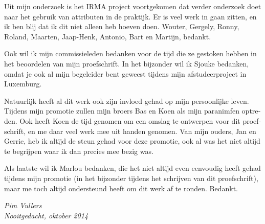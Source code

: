 \begin{otherlanguage}{dutch}
Uit mijn onderzoek is het IRMA project voortgekomen dat verder onderzoek doet
naar het gebruik van attributen in de praktijk. Er is veel werk in gaan zitten,
en ik ben blij dat ik dit niet alleen heb hoeven doen. Wouter, Gergely, Ronny,
Roland, Maarten, Jaap-Henk, Antonio, Bart en Martijn, bedankt.

Ook wil ik mijn commissieleden bedanken voor de tijd die ze gestoken hebben in 
het beoordelen van mijn proefschrift. In het bijzonder wil ik Sjouke bedanken, 
omdat je ook al mijn begeleider bent geweest tijdens mijn afstudeerproject in 
Luxemburg.

Natuurlijk heeft al dit werk ook zijn invloed gehad op mijn persoonlijke leven.
Tijdens mijn promotie zullen mijn broers Bas en Koen als mijn paranimfen 
optreden. Ook heeft Koen de tijd genomen om een omslag te ontwerpen voor dit
proefschrift, en me daar veel werk mee uit handen genomen. Van mijn ouders,
Jan en Gerrie, heb ik altijd de steun gehad voor deze promotie, ook al was het
niet altijd te begrijpen waar ik dan precies mee bezig was. 

Als laatste wil ik Marlou bedanken, die het niet altijd even eenvoudig heeft 
gehad tijdens mijn promotie (in het bijzonder tijdens het schrijven van dit 
proefschrift), maar me toch altijd ondersteund heeft om dit werk af te ronden. 
Bedankt.

\begin{flushright}\it
  Pim Vullers \\
  Nooitgedacht, oktober 2014
\end{flushright}

\end{otherlanguage}

\cleardoublepage
